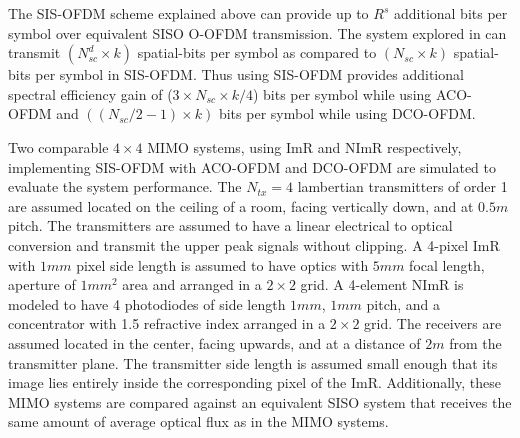 \documentclass[12pt,letterpaper,onecolumn]{article} %
\begin{document}
The SIS-OFDM scheme explained above can provide up to $R^s$ additional bits per symbol over equivalent SISO O-OFDM transmission. The system explored in \cite{zha12a} can transmit $(N_{sc}^d\times k)$ spatial-bits per symbol as compared to $(N_{sc}\times k)$ spatial-bits per symbol in SIS-OFDM. Thus using SIS-OFDM provides additional spectral efficiency gain of ($3\times N_{sc}\times k/4$) bits per symbol while using ACO-OFDM and $((N_{sc}/2 -1)\times k)$ bits per symbol while using DCO-OFDM.

Two comparable $4\times 4$ MIMO systems, using ImR and NImR respectively, implementing SIS-OFDM with ACO-OFDM and DCO-OFDM are simulated to evaluate the system performance. The $N_{tx}=4$ lambertian transmitters of order 1 are assumed located on the ceiling of a room, facing vertically down, and at $0.5m$ pitch. The transmitters are assumed to have a linear electrical to optical conversion and transmit the upper peak signals without clipping. A 4-pixel ImR with $1mm$ pixel side length is assumed to have optics with $5mm$ focal length, aperture of $1mm^2$ area and arranged in a $2\times 2$ grid. A 4-element NImR is modeled to have 4 photodiodes of side length $1mm$, $1mm$ pitch, and a concentrator with 1.5 refractive index arranged in a $2\times 2$ grid. The receivers are assumed located in the center, facing upwards, and at a distance of $2m$ from the transmitter plane. The transmitter side length is assumed small enough that its image lies entirely inside the corresponding pixel of the ImR. Additionally, these MIMO systems are compared against an equivalent SISO system that receives the same amount of average optical flux as in the MIMO systems. 
\end{document}
